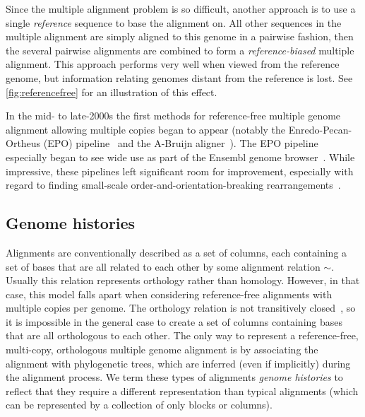 \documentclass[fleqn,10pt]{wlscirep}
\begin{document}
Since the multiple alignment problem is so difficult, another approach is to use a single \emph{reference} sequence to base the alignment on.
All other sequences in the multiple alignment are simply aligned to this genome in a pairwise fashion, then the several pairwise alignments are combined to form a \emph{reference-biased} multiple alignment.
This approach performs very well when viewed from the reference genome, but information relating genomes distant from the reference is lost. See \ref{fig:referencefree} for an illustration of this effect.

In the mid- to late-2000s the first methods for reference-free multiple genome alignment allowing multiple copies began to appear (notably the Enredo-Pecan-Ortheus (EPO) pipeline~\cite{epo} and the A-Bruijn aligner~\cite{aBruijn}).
The EPO pipeline especially began to see wide use as part of the Ensembl genome browser~\cite{ensembl2017}.
While impressive, these pipelines left significant room for improvement, especially with regard to finding small-scale order-and-orientation-breaking rearrangements~\cite{epo}.

\subsection{Genome histories}
Alignments are conventionally described as a set of columns, each containing a set of bases that are all related to each other by some alignment relation $\sim$.
Usually this relation represents orthology rather than homology.
However, in that case, this model falls apart when considering reference-free alignments with multiple copies per genome.
The orthology relation is not transitively closed~\cite{Koonin2005}, so it is impossible in the general case to create a set of columns containing bases that are all orthologous to each other.
The only way to represent a reference-free, multi-copy, orthologous multiple genome alignment is by associating the alignment with phylogenetic trees, which are inferred (even if implicitly) during the alignment process.
We term these types of alignments \emph{genome histories} to reflect that they require a different representation than typical alignments (which can be represented by a collection of only blocks or columns).
\end{document}
